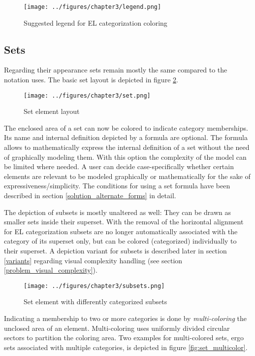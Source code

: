\documentclass[twoside, openright, 12pt]{book}
\begin{document}
\begin{figure}[htb]
	\centering
	\texttt{[image: ../figures/chapter3/legend.png]}
	\caption{Suggested legend for EL categorization coloring}
	\label{fig:legend}
\end{figure}



\subsection{Sets}
Regarding their appearance sets remain mostly the same compared to the notation \cite{Amthor18} uses.
The basic set layout is depicted in figure \ref{fig:set}.

\begin{figure}[htb]
	\centering
	\texttt{[image: ../figures/chapter3/set.png]}
	\caption{Set element layout}
	\label{fig:set}
\end{figure}

\noindent
The enclosed area of a set can now be colored to indicate category memberships.
Its name and internal definition depicted by a formula are optional.
The formula allows to mathematically express the internal definition of a set without the need of graphically modeling them.
With this option the complexity of the model can be limited where needed.
A user can decide case-specifically whether certain elements are relevant to be modeled graphically or mathematically for the sake of expressiveness/simplicity.
The conditions for using a set formula have been described in section \ref{solution_alternate_forms} in detail.

The depiction of subsets is mostly unaltered as well: They can be drawn as smaller sets inside their superset.
With the removal of the horizontal alignment for EL categorization subsets are no longer automatically associated with the category of its superset only, but can be colored (categorized) individually to their superset.
A depiction variant for subsets is described later in section \ref{variants} regarding visual complexity handling (see section \ref{problem_visual_complexity}).

\begin{figure}[htb]
	\centering
	\texttt{[image: ../figures/chapter3/subsets.png]}
	\caption{Set element with differently categorized subsets}
	\label{fig:subsets}
\end{figure}

\noindent
Indicating a membership to two or more categories is done by \textit{multi-coloring} the unclosed area of an element.
Multi-coloring uses uniformly divided circular sectors to partition the coloring area.
Two examples for multi-colored sets, ergo sets associated with multiple categories, is depicted in figure \ref{fig:set_multicolor}.
\end{document}
